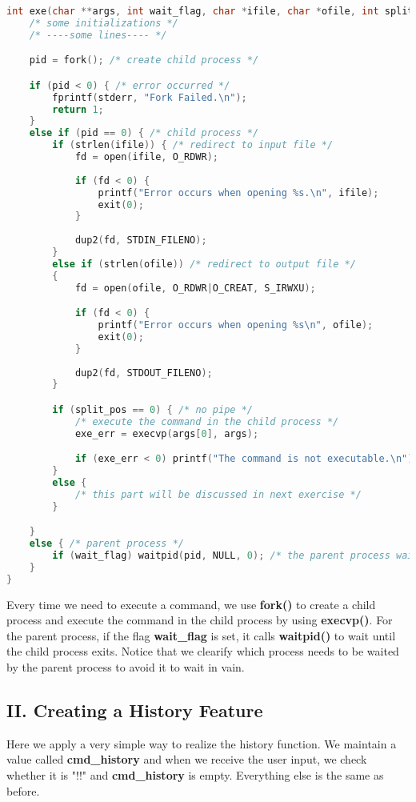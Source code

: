 \documentclass{article}
\begin{document}
\begin{lstlisting}[language=c, label={exe}, caption={exe()},captionpos=b]
int exe(char **args, int wait_flag, char *ifile, char *ofile, int split_pos) {
    /* some initializations */
    /* ----some lines---- */

    pid = fork(); /* create child process */

    if (pid < 0) { /* error occurred */
        fprintf(stderr, "Fork Failed.\n");
        return 1;
    }
    else if (pid == 0) { /* child process */
        if (strlen(ifile)) { /* redirect to input file */
            fd = open(ifile, O_RDWR);
            
            if (fd < 0) {
                printf("Error occurs when opening %s.\n", ifile);
                exit(0);
            }
            
            dup2(fd, STDIN_FILENO);
        }
        else if (strlen(ofile)) /* redirect to output file */
        {
            fd = open(ofile, O_RDWR|O_CREAT, S_IRWXU);

            if (fd < 0) {
                printf("Error occurs when opening %s\n", ofile);
                exit(0);
            }
            
            dup2(fd, STDOUT_FILENO);
        }

        if (split_pos == 0) { /* no pipe */
            /* execute the command in the child process */
            exe_err = execvp(args[0], args); 

            if (exe_err < 0) printf("The command is not executable.\n");
        }
        else {
            /* this part will be discussed in next exercise */
        }

    }
    else { /* parent process */
        if (wait_flag) waitpid(pid, NULL, 0); /* the parent process waits */
    }
}
\end{lstlisting}

Every time we need to execute a command, we use \textbf{fork()} to create a child process and execute the command in the child process by using \textbf{execvp()}. For the parent process, if the flag \textbf{wait\_flag} is set, it calls \textbf{waitpid()} to wait until the child process exits. Notice that we clearify which process needs to be waited by the parent process to avoid it to wait in vain.

\subsection*{II. Creating a History Feature}
Here we apply a very simple way to realize the history function. We maintain a value called \textbf{cmd\_history} and when we receive the user input, we check whether it is "!!" and \textbf{cmd\_history} is empty. Everything else is the same as before.
\end{document}
